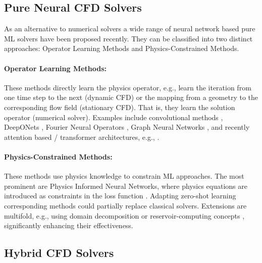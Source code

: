 \subsection{Pure Neural CFD Solvers}\label{sec:neuralCFD}
As an alternative to numerical solvers a wide range of neural network based pure ML solvers have been proposed recently. They can be classified into two distinct approaches: Operator Learning Methods and Physics-Constrained Methods.

\paragraph{Operator Learning Methods:} These methods directly learn the physics operator, e.g., learn the iteration from one time step to the next (dynamic CFD) or the mapping from a geometry to the corresponding flow field (stationary CFD). That is, they learn the solution operator (numerical solver). Examples include convolutional methods \cite{guo2016convolutional}, DeepONets \cite{lu2021learning}, Fourier Neural Operators \cite{li2020fourier}, Graph Neural Networks \cite{sanchez2020learning}, and recently attention based / transformer architectures, e.g., \cite{alkin2024universal, raonic2024convolutional, hao2023gnot, wu2023solving,luo2025transolver++}. 

\paragraph{Physics-Constrained Methods:} These methods use physics knowledge to constrain ML approaches. The most prominent are Physics Informed Neural Networks, where physics equations are introduced as constraints in the loss function \cite{lagaris1998artificial,raissi2019physics}. Adapting zero-shot learning corresponding methods could partially replace classical solvers. Extensions are multifold, e.g., using domain decomposition \cite{dolean2023multilevel} or reservoir-computing concepts \cite{chen2022bridging}, significantly enhancing their effectiveness. 

\subsection{Hybrid CFD Solvers}
\label{sec:LC_CNN_models}

